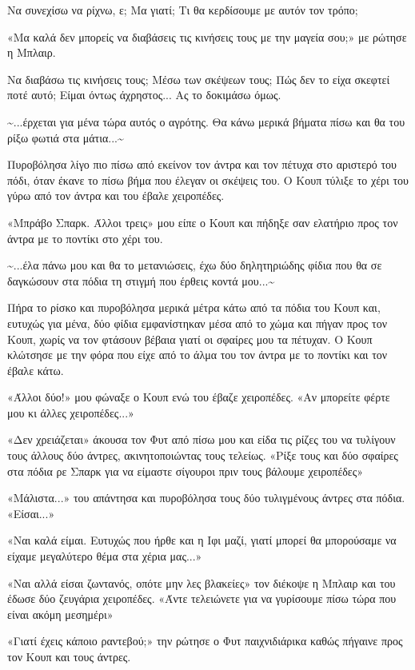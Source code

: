 \documentclass[12pt,twoside, openany]{book}
\begin{document}
Να συνεχίσω να ρίχνω, ε; Μα γιατί; Τι θα κερδίσουμε με αυτόν τον τρόπο;

«Μα καλά δεν μπορείς να διαβάσεις τις κινήσεις τους με την μαγεία σου;» με ρώτησε η Μπλαιρ.

Να διαβάσω τις κινήσεις τους; Μέσω των σκέψεων τους; Πώς δεν το είχα σκεφτεί ποτέ αυτό; Είμαι όντως άχρηστος... Ας το δοκιμάσω όμως.

\textasciitilde ...έρχεται για μένα τώρα αυτός ο αγρότης. Θα κάνω μερικά βήματα πίσω και θα του ρίξω φωτιά στα μάτια...\textasciitilde 

Πυροβόλησα λίγο πιο πίσω από εκείνον τον άντρα και τον πέτυχα στο αριστερό του πόδι, όταν έκανε το πίσω βήμα που έλεγαν οι σκέψεις του. Ο Κουπ τύλιξε το χέρι του γύρω από τον άντρα και του έβαλε χειροπέδες.

«Μπράβο Σπαρκ. Άλλοι τρεις» μου είπε ο Κουπ και πήδηξε σαν ελατήριο προς τον άντρα με το ποντίκι στο χέρι του.

\textasciitilde ...έλα πάνω μου και θα το μετανιώσεις, έχω δύο δηλητηριώδης φίδια που θα σε δαγκώσουν στα πόδια τη στιγμή που έρθεις κοντά μου...\textasciitilde 

Πήρα το ρίσκο και πυροβόλησα μερικά μέτρα κάτω από τα πόδια του Κουπ και, ευτυχώς για μένα, δύο φίδια εμφανίστηκαν μέσα από το χώμα και πήγαν προς τον Κουπ, χωρίς να τον φτάσουν βέβαια γιατί οι σφαίρες μου τα πέτυχαν. Ο Κουπ κλώτσησε με την φόρα που είχε από το άλμα του τον άντρα με το ποντίκι και τον έβαλε κάτω.

«Άλλοι δύο!» μου φώναξε ο Κουπ ενώ του έβαζε χειροπέδες. «Αν μπορείτε φέρτε μου κι άλλες χειροπέδες...»

«Δεν χρειάζεται» άκουσα τον Φυτ από πίσω μου και είδα τις ρίζες του να τυλίγουν τους άλλους δύο άντρες, ακινητοποιώντας τους τελείως. «Ρίξε τους και δύο σφαίρες στα πόδια ρε Σπαρκ για να είμαστε σίγουροι πριν τους βάλουμε χειροπέδες»

«Μάλιστα...» του απάντησα και πυροβόλησα τους δύο τυλιγμένους άντρες στα πόδια. «Είσαι...»

«Ναι καλά είμαι. Ευτυχώς που ήρθε και η Ιφι μαζί, γιατί μπορεί θα μπορούσαμε να είχαμε μεγαλύτερο θέμα στα χέρια μας...»

«Ναι αλλά είσαι ζωντανός, οπότε μην λες βλακείες» τον διέκοψε η Μπλαιρ και του έδωσε δύο ζευγάρια χειροπέδες. «Άντε τελειώνετε για να γυρίσουμε πίσω τώρα που είναι ακόμη μεσημέρι»

«Γιατί έχεις κάποιο ραντεβού;» την ρώτησε ο Φυτ παιχνιδιάρικα καθώς πήγαινε προς τον Κουπ και τους άντρες.
\end{document}
